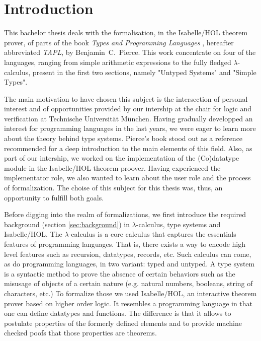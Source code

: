\section{Introduction}

This bachelor thesis deals with the formalisation, in the Isabelle/HOL theorem prover, of parts of
the book \emph{Types and Programming Languages} \cite{pierce-2002-TAPL}, hereafter abbreviated
\emph{TAPL}, by Benjamin~C.~Pierce. This work concentrate on four of the languages, ranging from
simple arithmetic expressions to the fully fledged $\lambda$-calculus, present in the first two
sections, namely "Untyped Systems" and "Simple Types".

The main motivation to have chosen this subject is the intersection of personal interest and of
opportunities provided by our intership at the chair for logic and verification at Technische
Universität München. Having gradually developped an interest for programming languages in the last
years, we were eager to learn more about the theory behind type systems. Pierce's book stood out as
a reference recommended for a deep introduction to the main elements of this field. Also, as part of
our intership, we worked on the implementation of the (Co)datatype module in the Isabelle/HOL
theorem proover. Having experienced the implementator role, we also wanted to learn about the user
role and the process of formalization. The choise of this subject for this thesis was, thus, an
opportunity to fulfill both goals.

Before digging into the realm of formalizations, we first introduce the required background (section
\ref{sec:background}) in $\lambda$-calculus, type systems and Isabelle/HOL. The $\lambda$-calculus
is a core calculus that captures the essentials features of programming languages. That is, there
exists a way to encode high level features such as recursion, datatypes, records, etc. Such calculus
can come, as do programming languages, in two variant: typed and untyped. A type system is a
syntactic method to prove the absence of certain behaviors such as the misusage of objects of a
certain nature (e.g. natural numbers, booleans, string of characters, etc.) To formalize those we
used Isabelle/HOL, an interactive theorem prover based on higher order logic. It resembles a
programming language in that one can define datatypes and functions. The difference is that it
allows to postulate properties of the formerly defined elements and to provide machine checked poofs
that those properties are theorems.

